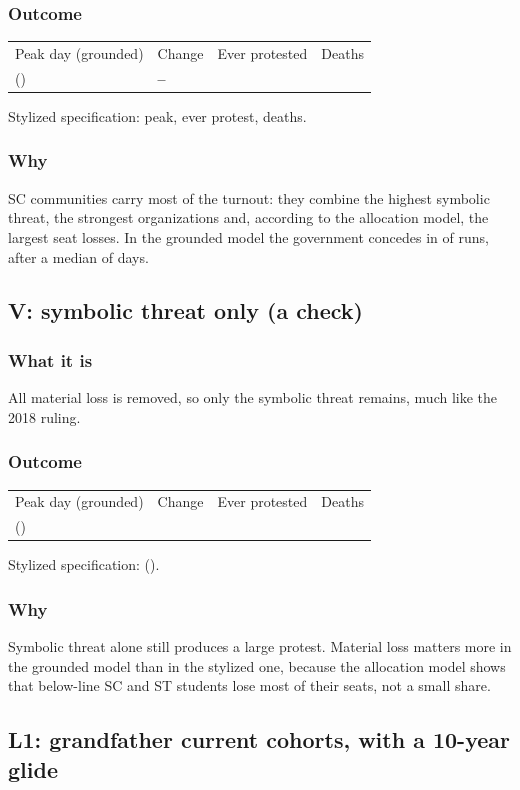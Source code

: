 \documentclass[11pt,a4paper]{article}
\makeatletter
\newcommand{\outcomeline}[6]{%
  \begin{tabular}{@{}llll@{}}
  \sffamily\small\color{muted}Peak day (grounded) & \sffamily\small\color{muted}Change & \sffamily\small\color{muted}Ever protested & \sffamily\small\color{muted}Deaths\\
  \textbf{#1} \small(#2) & \textbf{#3} & #4 & #5\\
  \end{tabular}\par\smallskip
  {\small\color{muted}Stylized specification: #6}\par}
\makeatother
\begin{document}
\subsubsection{Outcome}
\outcomeline{\PeakGroundedBaseline}{\PeakRangeGroundedBaseline}{--}{\CumulativeGroundedBaseline}{\DeathsGroundedBaseline}{\PeakCentralBaseline{} peak, \CumulativeCentralBaseline{} ever protest, \DeathsCentralBaseline{} deaths.}
\subsubsection{Why}
SC communities carry most of the turnout: they combine the highest symbolic threat, the strongest organizations and, according to the allocation model, the largest seat losses. In the grounded model the government concedes in \GroundedConcededShare{} of runs, after a median of \GroundedConcessionDay{} days.

\subsection{V: symbolic threat only (a check)}
\subsubsection{What it is}
All material loss is removed, so only the symbolic threat remains, much like the 2018 ruling.
\subsubsection{Outcome}
\outcomeline{\PeakGroundedSymbolicOnlyValidation}{\PeakRangeGroundedSymbolicOnlyValidation}{\PeakChangeGroundedSymbolicOnlyValidation}{\CumulativeGroundedSymbolicOnlyValidation}{\DeathsGroundedSymbolicOnlyValidation}{\PeakCentralSymbolicOnlyValidation{} (\PeakChangeCentralSymbolicOnlyValidation).}
\subsubsection{Why}
Symbolic threat alone still produces a large protest. Material loss matters more in the grounded model than in the stylized one, because the allocation model shows that below-line SC and ST students lose most of their seats, not a small share.

\subsection{L1: grandfather current cohorts, with a 10-year glide}
\end{document}
